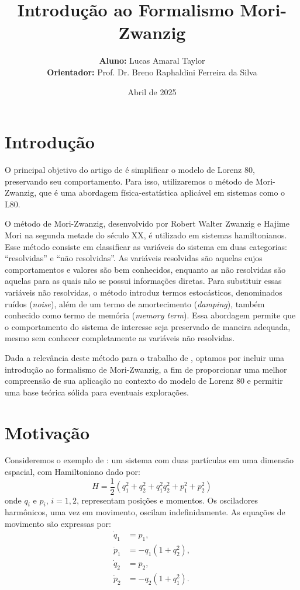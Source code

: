\documentclass[12pt]{article}
\title{Introdução ao Formalismo Mori-Zwanzig}
\date{Abril de 2025}
\author{
    \textbf{Aluno:} Lucas Amaral Taylor\\
    \textbf{Orientador:} Prof. Dr. Breno Raphaldini Ferreira da Silva
}
\begin{document}
\maketitle

\section{Introdução}
O principal objetivo do artigo de \citet{Chekroun2021} é simplificar o modelo de Lorenz 80, preservando seu comportamento. Para isso, utilizaremos o método de Mori-Zwanzig, que é uma abordagem física-estatística aplicável em sistemas como o L80.

O método de Mori-Zwanzig, desenvolvido por Robert Walter Zwanzig e Hajime Mori na segunda metade do século XX, é utilizado em sistemas hamiltonianos. Esse método consiste em classificar as variáveis do sistema em duas categorias: ``resolvidas'' e ``não resolvidas''. As variáveis resolvidas são aquelas cujos comportamentos e valores são bem conhecidos, enquanto as não resolvidas são aquelas para as quais não se possui informações diretas. Para substituir essas variáveis não resolvidas, o método introduz termos estocásticos, denominados ruídos (\textit{noise}), além de um termo de amortecimento (\textit{damping}), também conhecido como termo de memória (\textit{memory term}). Essa abordagem permite que o comportamento do sistema de interesse seja preservado de maneira adequada, mesmo sem conhecer completamente as variáveis não resolvidas.

Dada a relevância deste método para o trabalho de \citet{Chekroun2021}, optamos por incluir uma introdução ao formalismo de Mori-Zwanzig, a fim de proporcionar uma melhor compreensão de sua aplicação no contexto do modelo de Lorenz 80 e permitir uma base teórica sólida para eventuais explorações.
\newpage
\section{Motivação}
Consideremos o exemplo de \citet[p.173]{Chorin2013}: um sistema com duas partículas em uma dimensão espacial, com Hamiltoniano dado por:
\begin{equation*}
    H = \frac{1}{2}(q_1^2 + q_2^2 + q_1^2 q_2^2 + p_1^2 + p_2^2)
\end{equation*}
onde $q_i$ e $p_i$, $i = 1, 2$, representam posições e momentos. Os osciladores harmônicos, uma vez em movimento, oscilam indefinidamente. As equações de movimento são expressas por:
\begin{align}
    \dot{q}_1 &= p_1, \nonumber \\
    \dot{p}_1 &= -q_1(1 + q_2^2), \nonumber \\
    \dot{q}_2 &= p_2, \nonumber \\
    \dot{p}_2 &= -q_2(1 + q_1^2).
    \label{eq:exemplo-sistema-harmonico}
\end{align}
\end{document}
